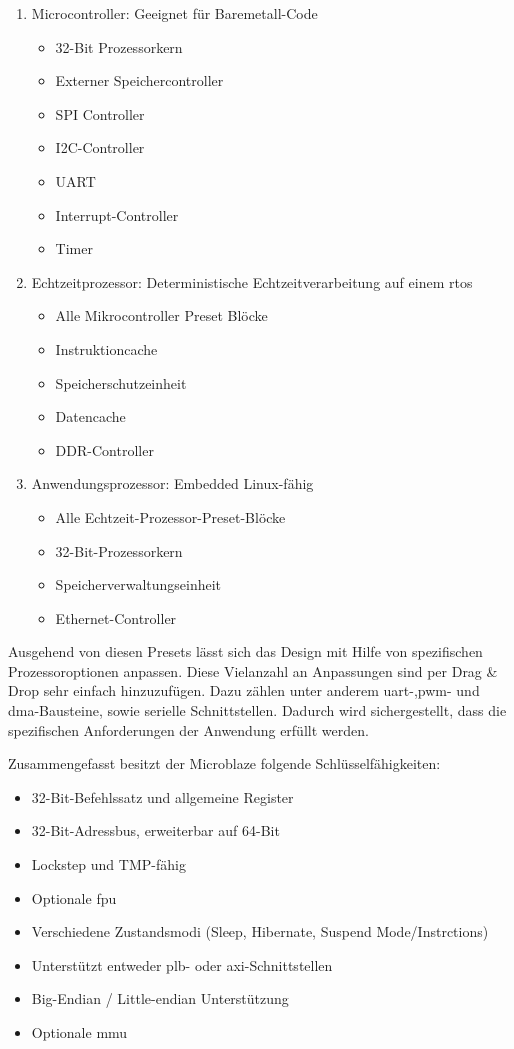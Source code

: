 \begin{enumerate}
  \item Microcontroller: Geeignet für Baremetall-Code
        \begin{itemize}
          \item 32-Bit Prozessorkern
          \item Externer Speichercontroller
          \item SPI Controller
          \item I2C-Controller
          \item UART
          \item Interrupt-Controller
          \item  Timer
        \end{itemize}
  \item Echtzeitprozessor: Deterministische Echtzeitverarbeitung auf einem \ac{rtos}
    \begin{itemize}
      \item Alle Mikrocontroller Preset Blöcke
      \item Instruktioncache
      \item Speicherschutzeinheit
      \item Datencache
      \item DDR-Controller
      \end{itemize}
  \item Anwendungsprozessor: Embedded Linux-fähig
        \begin{itemize}
          \item Alle Echtzeit-Prozessor-Preset-Blöcke
          \item 32-Bit-Prozessorkern
          \item Speicherverwaltungseinheit
          \item Ethernet-Controller
        \end{itemize}
\end{enumerate}

Ausgehend von diesen Presets lässt sich das Design mit Hilfe von spezifischen Prozessoroptionen anpassen.
 Diese Vielanzahl an Anpassungen sind per Drag \& Drop sehr einfach hinzuzufügen. Dazu zählen unter anderem \ac{uart}-,\ac{pwm}- und \ac{dma}-Bausteine, sowie serielle Schnittstellen.
 Dadurch wird sichergestellt, dass die spezifischen Anforderungen der Anwendung erfüllt werden.

Zusammengefasst besitzt der Microblaze folgende Schlüsselfähigkeiten:
\begin{itemize}
  \item 32-Bit-Befehlssatz und allgemeine Register
  \item 32-Bit-Adressbus, erweiterbar auf 64-Bit
  \item Lockstep und TMP-fähig
  \item Optionale \ac{fpu}
  \item Verschiedene Zustandsmodi (Sleep, Hibernate, Suspend Mode/Instrctions)
  \item Unterstützt entweder \ac{plb}- oder \ac{axi}-Schnittstellen
  \item Big-Endian / Little-endian Unterstützung
  \item Optionale \ac{mmu}
\end{itemize}


